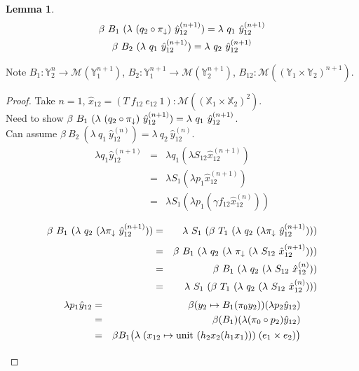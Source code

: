 \documentclass[12pt,a4paper]{article}
\newtheorem*{lemma*}{Lemma}
\theoremstyle{remark}
\newcommand{\bind}{\beta}
\newcommand{\lift}{\lambda}
\newcommand{\scnj}{\gamma}
\newcommand{\X}{\mathbb{X}}
\newcommand{\Y}{\mathbb{Y}}
\newcommand{\M}{\mathcal{M}}
\newcommand{\hx}{\hat{x}}
\newcommand{\hy}{\hat{y}}
\newcommand{\unitW}{\mathrm{unit}}
\begin{document}
\newpage
\begin{lemma*}
\[ \begin{gathered}
     \bind\ B_1\ (\lift\ (q_2 \circ \restrprec)\ \hy_{12}^{(n+1)}) = \lift\ q_1\ \hy_{12}^{(n+1)} \\
     \bind\ B_2\ (\lift\ q_1\ \hy_{12}^{(n+1)}) = \lift\ q_2\ \hy_{12}^{(n+1)} \\
   \end{gathered} \]
\end{lemma*}
\noindent
Note $B_1 : \Y_2^n \to \M(\Y_1^{n+1})$, $B_2 : \Y_1^{n+1}\to \M(\Y_2^{n+1})$, $B_{12}:\M((\Y_1\times\Y_2)^{n+1})$.
\begin{proof}
Take $n=1$, $\hx_{12} = (T\ f_{12}\ e_{12}\ 1) : \M((\X_1\times\X_2)^{2})$.
\\
Need to show $\bind\ B_1\ (\lift\ (q_2 \circ \restrprec)\ \hy_{12}^{(n+1)}) = \lift\ q_1\ \hy_{12}^{(n+1)}$.
\\
Can assume $\bind\ B_2\ (\lift\ q_1\ \hy_{12}^{(n)}) = \lift\ q_2\ \hy_{12}^{(n)}$.
\begin{eqnarray*}
\lift q_1 \hy_{12}^{(n+1)}
  &=& \lift q_1 ( \lift S_{12} \hx_{12}^{(n+1)} )  \\
  &=& \lift S_1 ( \lift p_1 \hx_{12}^{(n+1)} )  \\
  &=& \lift S_1 ( \lift p_1 (\scnj f_{12} \hx_{12}^{(n)} ) ) \\
\end{eqnarray*}
\begin{eqnarray*}
\bind\ B_1\ (\lift\ q_2\ (\lift \restrprec\ \hy_{12}^{(n+1)}))
  &=& \lift\ S_1\ (\bind\ T_1\ (\lift\ q_2\ (\lift \restrprec\ \hy_{12}^{(n+1)}))) \\[\jot]
%
  &=& \bind\ B_1\ (\lift\ q_2\ (\lift\ \restrprec\ (\lift\ S_{12}\ \hx_{12}^{(n+1)}))) \\
  &=& \bind\ B_1\ (\lift\ q_2\ (\lift\ S_{12}\ \hx_{12}^{(n)})) \\
  &=& \lift\ S_1\ (\bind\ T_1\ (\lift\ q_2\ (\lift\ S_{12}\ \hx_{12}^{(n)}))) \\
\end{eqnarray*}
\begin{eqnarray*}
\lift p_1 \hy_{12}
  &=& \bind (y_2 \mapsto B_1 (\pi_0 y_2)) (\lift p_2 \hy_{12}) \\
  &=& \bind (B_1) (\lift (\pi_0\circ p_2)\hy_{12}) \\
  &=& \bind B_1 \bigl(\lift\;(x_{12} \mapsto \unitW\ (h_2 x_2 (h_1 x_1)))\;(e_1\times e_2) \bigr) \\[2\jot]
\end{eqnarray*}
\end{proof}
\end{document}
